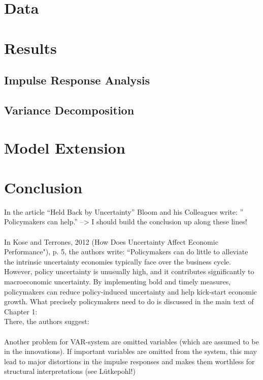 \documentclass[a4paper,11pt,listof=nochaptergap,oneside,pointednumbers,bibtotoc,bigheadings,liststotoc]{scrbook}
\theoremstyle{mysatz}
\theoremstyle{mydefinition}
\theoremstyle{mybemerkung}
\begin{document}
\begin{itemize}
\chapter{Data}
\label{sec:Data}

\chapter{Results}
\label{sec:Results}

\section[Impulse Response Analysis]{Impulse Response Analysis}
\label{sec:ImpulseResponseAnalysis}

\section[Variance Decomposition]{Variance Decomposition}
\label{sec:VarianceDecomposition}


\chapter{Model Extension}
\label{sec:ModelExtension}

\chapter{Conclusion}
\label{Conclusion}




In the article ``Held Back by Uncertainty'' Bloom and his Colleagues write: '' Policymakers can help.'' --> I should build the conclusion up along these lines! \\
\\
In Kose and Terrones, 2012 (How Does Uncertainty Affect Economic Performance"), p. 5, the authors write: ``Policymakers can do little to alleviate the intrinsic uncertainty economies typically face over the business cycle. However, policy uncertainty is unusually high, and it contributes significantly to macroeconomic uncertainty. By implementing bold and timely measures, policymakers can reduce policy-induced uncertainty and help kick-start economic growth. What precisely policymakers need to do is discussed in the main text of Chapter 1:\\
There, the authors suggest: 
\\
\\
Another problem for VAR-system are omitted variables (which are assumed to be in the innovations). If important variables are omitted from the system, this may lead to major distortions in the impulse responses and makes them worthless for structural interpretations (see Lütkepohl!)



\end{itemize}
\end{document}
